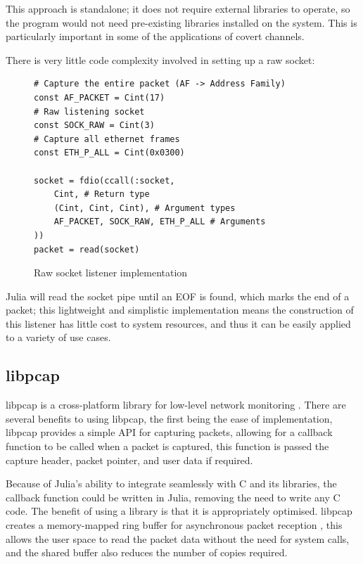 This approach is standalone; it does not require external libraries to operate, so the program would not need pre-existing libraries installed on the system. This is particularly important in some of the applications of covert channels.

There is very little code complexity involved in setting up a raw socket:

\begin{figure}[h]
\begin{lstlisting}[language=JuliaLocal, style=julia]
# Capture the entire packet (AF -> Address Family)
const AF_PACKET = Cint(17) 
# Raw listening socket
const SOCK_RAW = Cint(3)
# Capture all ethernet frames
const ETH_P_ALL = Cint(0x0300)

socket = fdio(ccall(:socket,
    Cint, # Return type
    (Cint, Cint, Cint), # Argument types
    AF_PACKET, SOCK_RAW, ETH_P_ALL # Arguments
))
packet = read(socket)
\end{lstlisting}
\caption{Raw socket listener implementation}
\label{fig:raw_sock}
\end{figure}
Julia will read the socket pipe until an EOF is found, which marks the end of a packet; this lightweight and simplistic implementation means the construction of this listener has little cost to system resources, and thus it can be easily applied to a variety of use cases.

\subsection{libpcap}

libpcap is a cross-platform library for low-level network monitoring \citep{libpcap}. 
There are several benefits to using libpcap, the first being the ease of implementation, libpcap provides a simple API for capturing packets, allowing for a callback function to be called when a packet is captured, this function is passed the capture header, packet pointer, and user data if required.

Because of Julia's ability to integrate seamlessly with C and its libraries, the callback function could be written in Julia, removing the need to write any C code. The benefit of using a library is that it is appropriately optimised. libpcap creates a memory-mapped ring buffer for asynchronous packet reception \citep{packet_7}, this allows the user space to read the packet data without the need for system calls, and the shared buffer also reduces the number of copies required.

